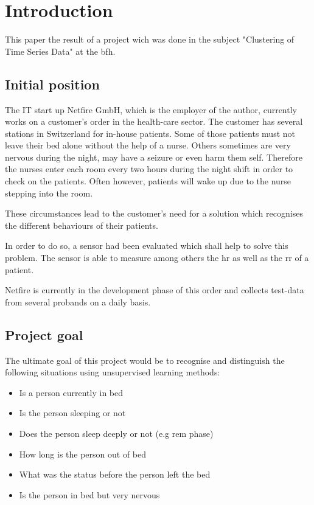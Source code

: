 \chapter{Introduction}

This paper the result of a project wich was done in the subject "Clustering of Time Series Data" at the \ac{bfh}.


\section{Initial position}

The IT start up Netfire GmbH, which is the employer of the author, currently works on a customer's order in the health-care sector. The customer has several stations in Switzerland for in-house patients. Some of those patients must not leave their bed alone without the help of a nurse. Others sometimes are very nervous during the night, may have a seizure or even harm them self.
Therefore the nurses enter each room every two hours during the night shift in order to check on the patients. Often however, patients will wake up due to the nurse stepping into the room.

These circumstances lead to the customer's need for a solution which recognises the different behaviours of their patients.

In order to do so, a sensor had been evaluated which shall help to solve this problem. The sensor is able to measure among others the \ac{hr} as well as the \ac{rr} of a patient.


Netfire is currently in the development phase of this order and collects test-data from several probands on a daily basis.

\clearpage
\section{Project goal}

The ultimate goal of this project would be to recognise and distinguish the following situations using unsupervised learning methods:

\begin{itemize}
  \item Is a person currently in bed
  \item Is the person sleeping or not
  \item Does the person sleep deeply or not (e.g \ac{rem} phase)
  \item How long is the person out of bed
  \item What was the status before the person left the bed
  \item Is the person in bed but very nervous
\end{itemize}

